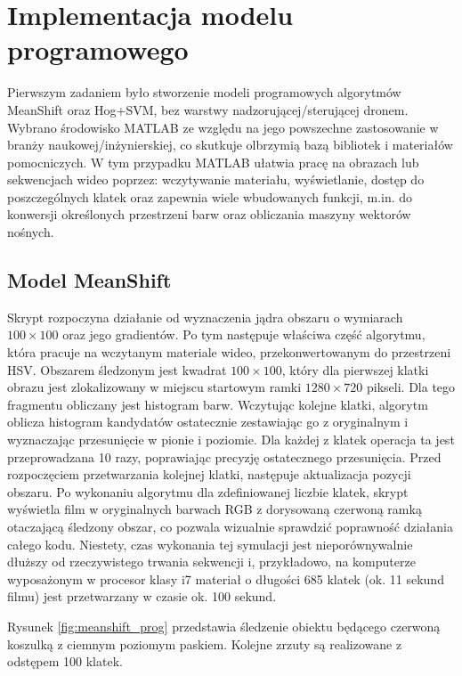\chapter{Implementacja modelu programowego}
Pierwszym zadaniem było stworzenie modeli programowych algorytmów MeanShift oraz Hog+SVM, bez warstwy nadzorującej/sterującej dronem. Wybrano środowisko MATLAB ze względu na jego powszechne zastosowanie w branży naukowej/inżynierskiej, co skutkuje olbrzymią bazą bibliotek i materiałów pomocniczych. W tym przypadku MATLAB ułatwia pracę na obrazach lub sekwencjach wideo poprzez: wczytywanie materiału, wyświetlanie, dostęp do poszczególnych klatek oraz zapewnia wiele wbudowanych funkcji, m.in. do konwersji określonych przestrzeni barw oraz obliczania maszyny wektorów nośnych.

\section{Model MeanShift}

Skrypt rozpoczyna działanie od wyznaczenia jądra obszaru o wymiarach $100 \times 100$ oraz jego gradientów. Po tym następuje właściwa część algorytmu, która pracuje na wczytanym materiale wideo, przekonwertowanym do przestrzeni HSV. Obszarem śledzonym jest kwadrat $100\times 100$, który dla pierwszej klatki obrazu jest zlokalizowany w miejscu startowym ramki $1280\times 720$ pikseli. Dla tego fragmentu obliczany jest histogram barw. Wczytując kolejne klatki, algorytm oblicza histogram kandydatów ostatecznie zestawiając go z oryginalnym i wyznaczając przesunięcie w pionie i poziomie. Dla każdej z klatek operacja ta jest przeprowadzana 10 razy, poprawiając precyzję ostatecznego przesunięcia. Przed rozpoczęciem przetwarzania kolejnej klatki, następuje aktualizacja pozycji obszaru. Po wykonaniu algorytmu dla zdefiniowanej liczbie klatek, skrypt wyświetla film w oryginalnych barwach RGB z dorysowaną czerwoną ramką otaczającą śledzony obszar, co pozwala wizualnie sprawdzić poprawność działania całego kodu. Niestety, czas wykonania tej symulacji jest nieporównywalnie dłuższy od rzeczywistego trwania sekwencji i, przykładowo, na komputerze wyposażonym w procesor klasy i7 materiał o długości 685 klatek (ok. 11 sekund filmu) jest przetwarzany w czasie ok. 100 sekund.

Rysunek \ref{fig:meanshift_prog} przedstawia śledzenie obiektu będącego czerwoną koszulką z ciemnym poziomym paskiem. Kolejne zrzuty są realizowane z odstępem 100 klatek.
 
